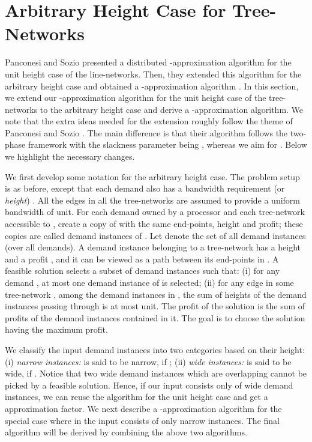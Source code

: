 \documentclass[11pt]{article}
\begin{document}
\section{Arbitrary Height Case for Tree-Networks}
\label{sec:arbit}
Panconesi and Sozio \cite{Pancc} presented a distributed -approximation algorithm
for the unit height case of the line-networks. Then, they extended this algorithm 
for the arbitrary height case and obtained a -approximation algorithm \cite{Pancj}.
In this section, we extend our -approximation algorithm for the unit height case
of the tree-networks to the arbitrary height case and derive a -approximation algorithm. 
We note that the extra ideas needed for the extension roughly follow the theme of Panconesi and Sozio \cite{Pancj}. 
The main difference is that their algorithm follows the two-phase framework with the 
slackness parameter being , whereas we aim for .
Below we highlight the necessary changes.

We first develop some notation for the arbitrary height case.
The problem setup is as before, except that each demand 
also has a bandwidth requirement (or {\em height}) .
All the edges in all the tree-networks are assumed to provide a uniform bandwidth of  unit.
For each demand  owned by a processor  and each tree-network  accessible to ,
create a copy of  with the same end-points, height and profit; these copies are called
demand instances of .
Let  denote the set of all demand instances (over all demands).
A demand instance  belonging to a tree-network  has a height  and a profit ,
and it can be viewed as a path between its end-points in .
A feasible solution selects a subset of demand instances 
such that: (i) for any demand , at most one demand instance of  is selected;
(ii) for any edge  in some tree-network ,
among the demand instances in , the sum of heights of the demand instances passing through  is at most  unit.
The profit of the solution is the sum of profits of the demand instances contained in it.
The goal is to choose the solution having the maximum profit.

We classify the input demand instances  into two categories based on their height:
(i) {\em narrow instances: }  is said to be narrow, if ;
(ii) {\em wide instances: }  is said to be wide, if .
Notice that two wide demand instances which are overlapping cannot be picked by a feasible solution.
Hence, if our input consists only of wide demand instances, we can reuse the algorithm for the unit height case
and get a  approximation factor.
We next describe a -approximation algorithm for the special case where in the input
consists of only narrow instances. The final algorithm will be derived by combining the above two algorithms.
\end{document}
